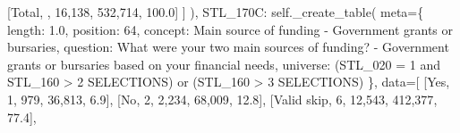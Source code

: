 \documentclass[
  11pt,
  a4paper,
]{article}
\newenvironment{Shaded}{\begin{snugshade}}{\end{snugshade}}
\newcommand{\NormalTok}[1]{\textcolor[rgb]{0.00,0.23,0.31}{#1}}
\newcommand{\OperatorTok}[1]{\textcolor[rgb]{0.37,0.37,0.37}{#1}}
\newcommand{\StringTok}[1]{\textcolor[rgb]{0.13,0.47,0.30}{#1}}
\newcommand{\VariableTok}[1]{\textcolor[rgb]{0.07,0.07,0.07}{#1}}
\begin{document}
\begin{Shaded}
\begin{Highlighting}[]
\NormalTok{                    [}\StringTok{\textquotesingle{}Total\textquotesingle{}}\NormalTok{, }\StringTok{\textquotesingle{}\textquotesingle{}}\NormalTok{, }\StringTok{\textquotesingle{}16,138\textquotesingle{}}\NormalTok{, }\StringTok{\textquotesingle{}532,714\textquotesingle{}}\NormalTok{, }\StringTok{\textquotesingle{}100.0\textquotesingle{}}\NormalTok{]}
\NormalTok{                ]}
\NormalTok{            ),}
            \StringTok{\textquotesingle{}STL\_170C\textquotesingle{}}\NormalTok{: }\VariableTok{self}\NormalTok{.\_create\_table(}
\NormalTok{                meta}\OperatorTok{=}\NormalTok{\{}
                    \StringTok{\textquotesingle{}length\textquotesingle{}}\NormalTok{: }\StringTok{\textquotesingle{}1.0\textquotesingle{}}\NormalTok{, }\StringTok{\textquotesingle{}position\textquotesingle{}}\NormalTok{: }\StringTok{\textquotesingle{}64\textquotesingle{}}\NormalTok{,}
                    \StringTok{\textquotesingle{}concept\textquotesingle{}}\NormalTok{: }\StringTok{\textquotesingle{}Main source of funding {-} Government grants or bursaries\textquotesingle{}}\NormalTok{,}
                    \StringTok{\textquotesingle{}question\textquotesingle{}}\NormalTok{: }\StringTok{\textquotesingle{}What were your two main sources of funding? {-} Government grants or bursaries based on your financial needs\textquotesingle{}}\NormalTok{,}
                    \StringTok{\textquotesingle{}universe\textquotesingle{}}\NormalTok{: }\StringTok{\textquotesingle{}(STL\_020 = 1 and STL\_160 \textgreater{} 2 SELECTIONS) or (STL\_160 \textgreater{} 3 SELECTIONS)\textquotesingle{}}
\NormalTok{                \},}
\NormalTok{                data}\OperatorTok{=}\NormalTok{[}
\NormalTok{                    [}\StringTok{\textquotesingle{}Yes\textquotesingle{}}\NormalTok{, }\StringTok{\textquotesingle{}1\textquotesingle{}}\NormalTok{, }\StringTok{\textquotesingle{}979\textquotesingle{}}\NormalTok{, }\StringTok{\textquotesingle{}36,813\textquotesingle{}}\NormalTok{, }\StringTok{\textquotesingle{}6.9\textquotesingle{}}\NormalTok{],}
\NormalTok{                    [}\StringTok{\textquotesingle{}No\textquotesingle{}}\NormalTok{, }\StringTok{\textquotesingle{}2\textquotesingle{}}\NormalTok{, }\StringTok{\textquotesingle{}2,234\textquotesingle{}}\NormalTok{, }\StringTok{\textquotesingle{}68,009\textquotesingle{}}\NormalTok{, }\StringTok{\textquotesingle{}12.8\textquotesingle{}}\NormalTok{],}
\NormalTok{                    [}\StringTok{\textquotesingle{}Valid skip\textquotesingle{}}\NormalTok{, }\StringTok{\textquotesingle{}6\textquotesingle{}}\NormalTok{, }\StringTok{\textquotesingle{}12,543\textquotesingle{}}\NormalTok{, }\StringTok{\textquotesingle{}412,377\textquotesingle{}}\NormalTok{, }\StringTok{\textquotesingle{}77.4\textquotesingle{}}\NormalTok{],}

\end{Highlighting}
\end{Shaded}
\end{document}
